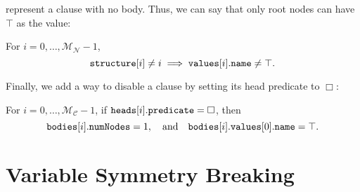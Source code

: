 \documentclass[runningheads]{llncs}
\newcommand{\variable}[1]{\texttt{\textup{#1}}}
\newcommand{\maxNumNodes}{\mathcal{M}_{\mathcal{N}}}
\newcommand{\maxNumClauses}{\mathcal{M}_{\mathcal{C}}}
\begin{document}
represent a clause with no body. Thus, we can say that only root nodes can have
$\top$ as the value:
\begin{constraint}
  For $i = 0, \dots, \maxNumNodes{} - 1$,
  \[
    \variable{structure}[i] \ne i \implies
    \variable{values}[i].\variable{name} \ne \top.
  \]
\end{constraint}
Finally, we add a way to disable a clause by setting its head predicate to
$\Box$:
\begin{constraint}
  For $i = 0, \dots, \maxNumClauses{} - 1$, if
  $\variable{heads}[i].\variable{predicate} = \Box$, then
  \[
    \variable{bodies}[i].\variable{numNodes} = 1, \quad \text{and}
    \quad \variable{bodies}[i].\variable{values}[0].\variable{name} = \top.
  \]
\end{constraint}

\section{Variable Symmetry Breaking} \label{sec:variable_symmetry}
\end{document}
